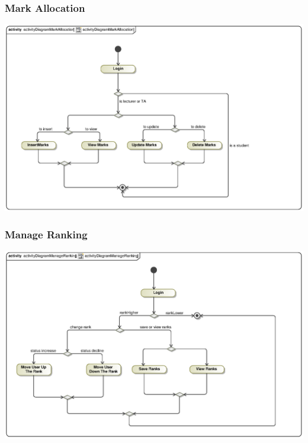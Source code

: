 \documentclass[hidelinks, 12pt, oneside]{article}
\begin{document}
\subsubsection{Mark Allocation}
\includegraphics[scale=.9]{Kgomotso/graphics/activityDiagramMarkAllocation.eps}\\

\subsubsection{Manage Ranking}
\includegraphics[scale=.9]{Kgomotso/graphics/activityDiagramManageRanking.eps}\\
\end{document}
